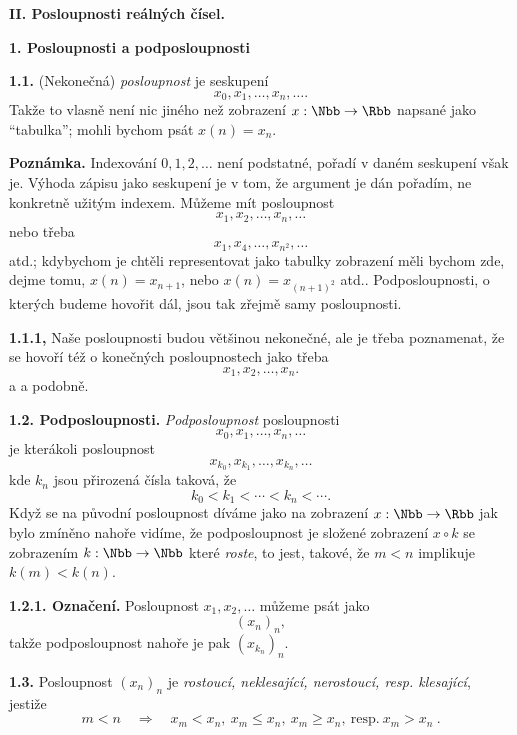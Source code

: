 \documentclass[12pt]{article}
\begin{document}
\newpage

\centerline{\Large\bf II. Posloupnosti reálných čísel.} 
 
 \vskip10mm
 
 {\large\bf 1. Posloupnosti a podposloupnosti}
 
 \bigskip
 
 {\bf 1.1.} (Nekonečná) {\em posloupnost} je seskupení
 $$
 x_0,x_1,\dots,x_n,\dots .
 $$
 Takže to vlasně není nic jiného než zobrazení $x:\Nbb\to\Rbb$ napsané jako  ``tabulka''; mohli bychom psát $x(n)=x_n$. 
 
 \medskip
 
 {\bf Poznámka.} Indexování $0,1,2,\dots$  není podstatné, pořadí v daném seskupení však je. 
Výhoda zápisu jako seskupení je v tom, že argument je dán pořadím, ne konkretně užitým indexem. Můžeme mít posloupnost
 $$
 x_1,x_2,\dots,x_n,\dots 
 $$
 nebo třeba
 $$
 x_1,x_4,\dots,x_{n^2},\dots 
 $$
 atd.; kdybychom je chtěli representovat jako tabulky zobrazení měli bychom zde, dejme tomu, $x(n)=x_{n+1}$, nebo $x(n)=x_{(n+1)^2}$ atd.. Podposloupnosti, o kterých budeme hovořit dál, jsou tak z\v rejm\v e samy posloupnosti.
 
 
 \medskip
 
 {\bf 1.1.1,} Naše posloupnosti budou většinou nekonečné, ale je třeba poznamenat, že se hovoří též o konečných posloupnostech jako třeba
 $$
 x_1,x_2,\dots, x_n.
 $$
 a a podobně.
 
 \bigskip
 
 {\bf 1.2.  Podposloupnosti.} {\em Podposloupnost } posloupnosti
$$
 x_0,x_1,\dots,x_n,\dots 
 $$
je kterákoli posloupnost
 $$
 x_{k_0},x_{k_1},\dots,x_{k_n},\dots 
 $$
kde $k_n$ jsou přirozená čísla taková, že
 $$
 k_0<k_1<\cdots<k_n<\cdots .
 $$
 Když se na původní posloupnost díváme jako na zobrazení $x:\Nbb\to\Rbb$ jak bylo zmíněno nahoře vidíme, že podposloupnost je složené zobrazení $x\circ k$ se zobrazením $k:\Nbb\to\Nbb$ které
 {\em roste}, to jest, takové, že $m<n$ implikuje $k(m)<k(n)$.
 
 \medskip
 
 {\bf 1.2.1. Označení.} Posloupnost $x_1,x_2,\dots$ můžeme psát jako
 $$
 (x_n)_n,
 $$
 takže podposloupnost nahoře je pak
 $(x_{k_n})_n$.
 
 \bigskip
 
 {\bf 1.3.} Posloupnost $(x_n)_n$ je {\em rostoucí, neklesající, nerostoucí, resp. klesající}, jestiže
 $$
 m<n\quad{\Rightarrow}\quad x_m<x_n,\ x_m\leq x_n,\ x_m\geq x_n,\  \text{resp.}  \ x_m>x_n\ .
 $$
 
\end{document}

